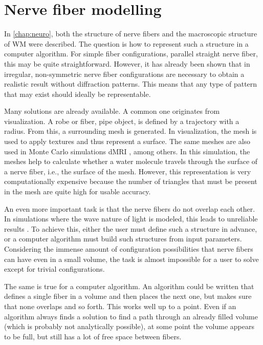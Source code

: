 \setcounter{chapter}{3}
\chapter{Nerve fiber modelling}
\label{chap:sof:modelling}
%
\par
In \cref{chap:neuro}, both the structure of nerve fibers and the macroscopic structure of \ac{WM} were described.
The question is how to represent such a structure in a computer algorithm.
For simple fiber configurations, \eg{} parallel straight nerve fiber, this may be quite straightforward.
However, it has already been shown that in \dummy{} \cite{MenzelDissertation} irregular, non-symmetric nerve fiber configurations are necessary to obtain a realistic result without diffraction patterns.
This means that any type of pattern that may exist should ideally be representable.
\par
%
Many solutions are already available.
A common one originates from visualization.
A robe or fiber, \ie{} pipe object, is defined by a trajectory with a radius.
From this, a surrounding mesh is generated.
In visualization, the mesh is used to apply textures and thus represent a surface.
The same meshes are also used in Monte Carlo simulations \ac{dMRI} \cite{Ginsburger2019,ginsburgerDis2019}, among others.
In this simulation, the meshes help to calculate whether a water molecule travels through the surface of a nerve fiber, i.e., the surface of the mesh. 
However, this representation is very computationally expensive because the number of triangles that must be present in the mesh are quite high for usable accuracy.
\par
%
An even more important task is that the nerve fibers do not overlap each other.
%
In simulations where the wave nature of light is modeled, this leads to unreliable results \cite{MenzelDissertation}.
To achieve this, either the user must define such a structure in advance, or a computer algorithm must build such structures from input parameters.
Considering the immense amount of configuration possibilities that nerve fibers can have even in a small volume, the task is almost impossible for a user to solve except for trivial configurations.
\par
%
The same is true for a computer algorithm.
An algorithm could be written that defines a single fiber in a volume and then places the next one, but makes sure that none overlaps and so forth.
This works well up to a point.
Even if an algorithm always finds a solution to find a path through an already filled volume (which is probably not analytically possible), at some point the volume appears to be full, but still has a lot of free space between fibers.
